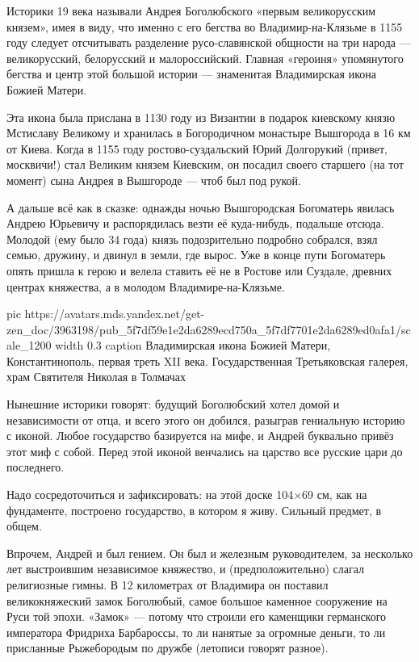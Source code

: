 Историки 19 века называли Андрея Боголюбского «первым великорусским князем»,
имея в виду, что именно с его бегства во Владимир-на-Клязьме в 1155 году
следует отсчитывать разделение русо-славянской общности на три народа —
великорусский, белорусский и малороссийский. Главная «героиня» упомянутого
бегства и центр этой большой истории — знаменитая Владимирская икона Божией
Матери.

Эта икона была прислана в 1130 году из Византии в подарок киевскому князю
Мстиславу Великому и хранилась в Богородичном монастыре Вышгорода в 16 км от
Киева. Когда в 1155 году ростово-суздальский Юрий Долгорукий (привет,
москвичи!) стал Великим князем Киевским, он посадил своего старшего (на тот
момент) сына Андрея в Вышгороде — чтоб был под рукой.

А дальше всё как в сказке: однажды ночью Вышгородская Богоматерь явилась Андрею
Юрьевичу и распорядилась везти её куда-нибудь, подальше отсюда. Молодой (ему
было 34 года) князь подозрительно подробно собрался, взял семью, дружину, и
двинул в земли, где вырос. Уже в конце пути Богоматерь опять пришла к герою и
велела ставить её не в Ростове или Суздале, древних центрах княжества, а в
молодом Владимире-на-Клязьме.

\ifcmt
  pic https://avatars.mds.yandex.net/get-zen_doc/3963198/pub_5f7df59e1e2da6289ecd750a_5f7df7701e2da6289ed0afa1/scale_1200
  width 0.3
	caption Владимирская икона Божией Матери, Константинополь, первая треть XII века. Государственная Третьяковская галерея, храм Святителя Николая в Толмачах
\fi

Нынешние историки говорят: будущий Боголюбский хотел домой и независимости от
отца, и всего этого он добился, разыграв гениальную историю с иконой. Любое
государство базируется на мифе, и Андрей буквально привёз этот миф с собой.
Перед этой иконой венчались на царство все русские цари до последнего.

Надо сосредоточиться и зафиксировать: на этой доске 104×69 см, как на
фундаменте, построено государство, в котором я живу. Сильный предмет, в общем.

Впрочем, Андрей и был гением. Он был и железным руководителем, за несколько лет
выстроившим независимое княжество, и (предположительно) слагал религиозные
гимны. В 12 километрах от Владимира он поставил великокняжеский замок
Боголюбый, самое большое каменное сооружение на Руси той эпохи. «Замок» —
потому что строили его каменщики германского императора Фридриха Барбароссы, то
ли нанятые за огромные деньги, то ли присланные Рыжебородым по дружбе (летописи
говорят разное). 

